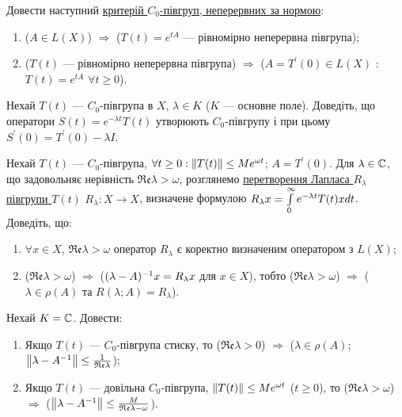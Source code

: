 
\begin{exercise}\label{N:2_2_8}
    Довести наступний \ul{критерій $C_0$-півгруп, неперервних за 
    нормою}:
    \begin{enumerate}
        \item ($A \in L(X)$) $\Rightarrow$ ($T(t) = e^{tA}$ 
        --- рівномірно неперервна півгрупа);
        \item ($T(t)$ --- рівномірно неперервна півгрупа) $\Rightarrow$ 
        ($A = T^{\prime}(0) \in L(X)$ : $T(t) = e^{tA}$ $\forall t \geq 0$).
    \end{enumerate}
\end{exercise}

\begin{exercise}
    Нехай $T(t)$ --- $C_0$-півгрупа в $X$, $\lambda \in K$ ($K$ --- основне поле). Доведіть, 
    що оператори $S(t) = e^{-\lambda t}T(t)$ утворюють $C_0$-півгрупу і при цьому 
    $S^{\prime}(0) = T^{\prime}(0) - \lambda I$. 
\end{exercise}

\begin{exercise}
    Нехай $T(t)$ --- $C_0$-півгрупа, $\forall t \geq 0 : \left\lVert T(t)\right\rVert \leq Me^{\omega t}$;
    $A = T^{\prime}(0)$. Для $\lambda \in \mathbb{C}$, що задовольняє нерівність $\mathfrak{Re}\lambda > \omega$,
    розглянемо \ul{перетворення Лапласа $R_\lambda$ півгрупи $T(t)$} $R_\lambda : 
    X \rightarrow X$, визначене формулою $R_\lambda x = \int\limits_{0}^{\infty}e^{-\lambda t} T(t)
    x dt$. Доведіть, що:
    \begin{enumerate}
        \item $\forall x \in X$, $\mathfrak{Re} \lambda > \omega$ оператор 
        $R_\lambda$ є коректно визначеним оператором з $L(X)$;
        \item ($\mathfrak{Re} \lambda > \omega$) $\Rightarrow$ ($(\lambda - A)^{-1}x = R_\lambda x$ 
        для $x \in X$), тобто ($\mathfrak{Re} \lambda > \omega$) $\Rightarrow$ ($\lambda \in \rho(A)$
        та $R(\lambda; A) = R_\lambda$).
    \end{enumerate}
\end{exercise}

\begin{exercise}
    Нехай $K = \mathbb{C}$. Довести:
    \begin{enumerate}
        \item Якщо $T(t)$ --- $C_0$-півгрупа стиску, то ($\mathfrak{Re}\lambda > 0$) $\Rightarrow$
        ($\lambda \in \rho(A)$; $\left\lVert\lambda - A^{-1}\right\rVert \leq \frac{1}{\mathfrak{Re} \lambda}$);
        \item Якщо $T(t)$ --- довільна $C_0$-півгрупа, $\left\lVert T(t)\right\rVert \leq Me^{\omega t}$ 
        ($t \geq 0$), то ($\mathfrak{Re} \lambda > \omega$) $\Rightarrow$ 
        ($\left\lVert\lambda - A^{-1}\right\rVert \leq \frac{M}{\mathfrak{Re}\lambda - \omega}$).
    \end{enumerate}
\end{exercise}

